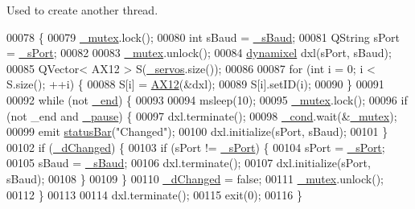 Used to create another thread. 


\begin{DoxyCode}
00078 \{
00079     \hyperlink{a00007_a6327eafc0dac189ec1b202d63ef32457}{\_mutex}.lock();
00080     \textcolor{keywordtype}{int} sBaud = \hyperlink{a00007_a5b9a41b9e271275b914affb0a845a2ee}{\_sBaud};
00081     QString sPort = \hyperlink{a00007_ac9a614aa1518efb49b0a06636bd1bdbf}{\_sPort};
00082     
00083     \hyperlink{a00007_a6327eafc0dac189ec1b202d63ef32457}{\_mutex}.unlock();
00084     \hyperlink{a00003}{dynamixel} dxl(sPort, sBaud);
00085     QVector< AX12 > S(\hyperlink{a00007_a1ac6662fe6d198b5971ae0ffa7ddfcfd}{\_servos}.size());    
00086     
00087     \textcolor{keywordflow}{for} (\textcolor{keywordtype}{int} i = 0; i < S.size(); ++i) \{
00088         S[i] = \hyperlink{a00001}{AX12}(&dxl);  
00089         S[i].setID(i);
00090     \}
00091     
00092     \textcolor{keywordflow}{while} (not \hyperlink{a00007_acca9896d1a2d1ef68527e6834f81c76c}{\_end}) \{
00093         
00094         msleep(10);
00095         \hyperlink{a00007_a6327eafc0dac189ec1b202d63ef32457}{\_mutex}.lock();
00096         \textcolor{keywordflow}{if} (not \_end and \hyperlink{a00007_aaf2ef80e8e43518b75d20a5102970d2e}{\_pause}) \{
00097             dxl.terminate();
00098             \hyperlink{a00007_afcb93c09acd7fecf47d92996a297365c}{\_cond}.wait(&\hyperlink{a00007_a6327eafc0dac189ec1b202d63ef32457}{\_mutex});
00099             emit \hyperlink{a00007_a3c84cf179d1746091795c60f3a68ce06}{statusBar}(\textcolor{stringliteral}{"Changed"});
00100             dxl.initialize(sPort, sBaud);
00101         \}        
00102         \textcolor{keywordflow}{if} (\hyperlink{a00007_a2b6ccfeacbb3cc9ac5c34549b9aa3f11}{\_dChanged}) \{
00103             \textcolor{keywordflow}{if} (sPort != \hyperlink{a00007_ac9a614aa1518efb49b0a06636bd1bdbf}{\_sPort}) \{
00104                 sPort = \hyperlink{a00007_ac9a614aa1518efb49b0a06636bd1bdbf}{\_sPort};
00105                 sBaud = \hyperlink{a00007_a5b9a41b9e271275b914affb0a845a2ee}{\_sBaud};
00106                 dxl.terminate();
00107                 dxl.initialize(sPort, sBaud);
00108             \}   
00109         \}
00110         \hyperlink{a00007_a2b6ccfeacbb3cc9ac5c34549b9aa3f11}{\_dChanged} = \textcolor{keyword}{false};
00111         \hyperlink{a00007_a6327eafc0dac189ec1b202d63ef32457}{\_mutex}.unlock();
00112     \}
00113     
00114     dxl.terminate();
00115     exit(0);
00116 \}
\end{DoxyCode}
\hypertarget{a00007_ae17f4b27cae8b171f48fd55d2dc72dbd}{}
